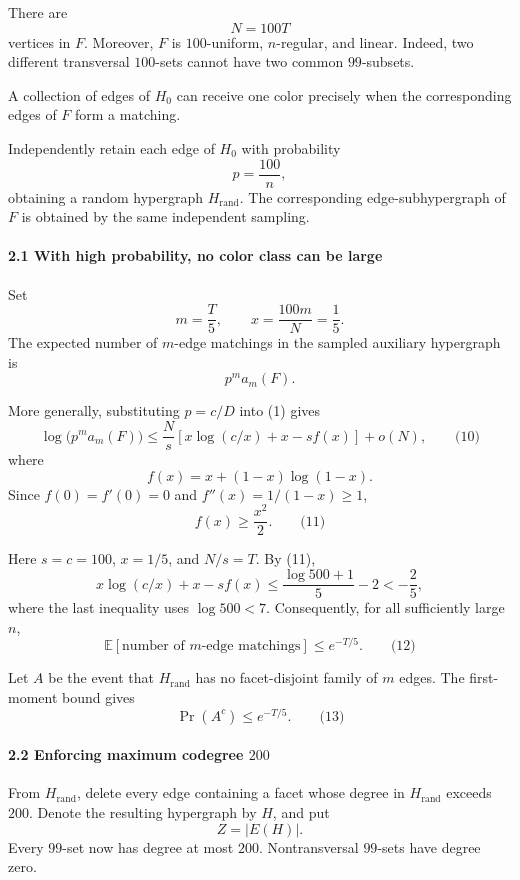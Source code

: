 \documentclass[
  11pt,
  a4paper,
]{article}
\begin{document}
There are \[
N=100T
\] vertices in \(F\). Moreover, \(F\) is \(100\)-uniform, \(n\)-regular,
and linear. Indeed, two different transversal \(100\)-sets cannot have
two common \(99\)-subsets.

A collection of edges of \(H_0\) can receive one color precisely when
the corresponding edges of \(F\) form a matching.

Independently retain each edge of \(H_0\) with probability \[
p=\frac{100}{n},
\] obtaining a random hypergraph \(H_{\mathrm{rand}}\). The
corresponding edge-subhypergraph of \(F\) is obtained by the same
independent sampling.

\paragraph{2.1 With high probability, no color class can be
large}\label{with-high-probability-no-color-class-can-be-large}

Set \[
m=\frac T5,\qquad x=\frac{100m}{N}=\frac15.
\] The expected number of \(m\)-edge matchings in the sampled auxiliary
hypergraph is \[
p^m a_m(F).
\]

More generally, substituting \(p=c/D\) into (1) gives \[
\log\bigl(p^m a_m(F)\bigr)
\le
\frac Ns\left[
x\log(c/x)+x-sf(x)
\right]+o(N), \qquad\text{(10)}
\] where \[
f(x)=x+(1-x)\log(1-x).
\] Since \(f(0)=f'(0)=0\) and \(f''(x)=1/(1-x)\ge1\), \[
f(x)\ge\frac{x^2}{2}. \qquad\text{(11)}
\]

Here \(s=c=100\), \(x=1/5\), and \(N/s=T\). By (11), \[
x\log(c/x)+x-sf(x)
\le
\frac{\log500+1}{5}-2
<
-\frac25,
\] where the last inequality uses \(\log500<7\). Consequently, for all
sufficiently large \(n\), \[
\mathbb E[\text{number of \(m\)-edge matchings}]
\le e^{-T/5}. \qquad\text{(12)}
\]

Let \(A\) be the event that \(H_{\mathrm{rand}}\) has no facet-disjoint
family of \(m\) edges. The first-moment bound gives \[
\Pr(A^c)\le e^{-T/5}. \qquad\text{(13)}
\]

\paragraph{\texorpdfstring{2.2 Enforcing maximum codegree
\(200\)}{2.2 Enforcing maximum codegree 200}}\label{enforcing-maximum-codegree-200}

From \(H_{\mathrm{rand}}\), delete every edge containing a facet whose
degree in \(H_{\mathrm{rand}}\) exceeds \(200\). Denote the resulting
hypergraph by \(H\), and put \[
Z=|E(H)|.
\] Every \(99\)-set now has degree at most \(200\). Nontransversal
\(99\)-sets have degree zero.
\end{document}
